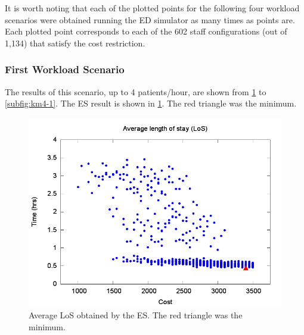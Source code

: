 \documentclass[11pt]{article} %
\begin{document}
It is worth noting that each of the plotted points for the following
four workload scenarios were obtained running the ED simulator as
many times as points are. Each plotted point corresponds to each of
the 602 staff configurations (out of 1,134) that satisfy the cost
restriction.


\subsubsection{First Workload Scenario}
\label{ssub:Case-Study-1A}

The results of this scenario, up to 4 patients/hour, are shown from
\ref{subfig:es4-1} to \ref{subfig:km4-1}. The ES result is shown
in \ref{subfig:es4-1}. The red triangle was the minimum. 
\begin{figure}[H]
\noindent \begin{centering}
\includegraphics[width=0.95\columnwidth,height=0.23\paperheight]{figs4/v0/6400-602-25-exh-LoS-min}
\par\end{centering}

\caption{Average LoS obtained by the ES. The red triangle was the minimum.
\label{subfig:es4-1}}
\end{figure}
\end{document}
